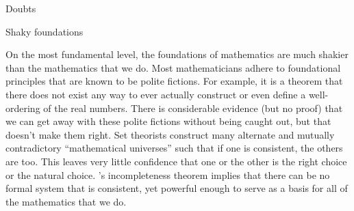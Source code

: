 \begin{plSection}{Doubts}
\begin{plSection}{Shaky foundations}
\begin{plQuote}
{}
{}
On the most fundamental level, the foundations of mathematics are much shakier
than the mathematics that we do. Most mathematicians adhere to foundational
principles that are known to be polite fictions. For example, it is a theorem that
there does not exist any way to ever actually construct or even define a well-ordering
of the real numbers. There is considerable evidence (but no proof) that we can get
away with these polite fictions without being caught out, but that doesn’t make
them right. Set theorists construct many alternate and mutually contradictory
``mathematical universes'' such that if one is consistent, the others are too. This
leaves very little confidence that one or the other is the right choice or the natural
choice. {\Godel}’s incompleteness theorem implies that there can be no formal system
that is consistent, yet powerful enough to serve as a basis for all of the mathematics
that we do.
\end{plQuote}


\end{plSection}
\end{plSection}
